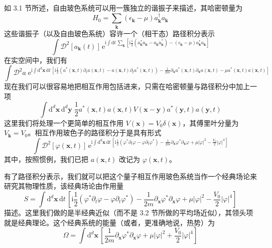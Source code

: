 如 3.1 节所述，自由玻色系统可以用一簇独立的谐振子来描述，其哈密顿量为
\begin{equation*}
H_0=\sum_{\pmb{k}}(\epsilon_{\pmb{k}}-\mu)a_{\pmb{k}}^{\dagger}a_{\pmb{k}}
\end{equation*}
这些谐振子（以及自由玻色系统）容许一个（相干态）路径积分表示
\begin{equation*}
\int\mathcal{D}^2\left[a_{\pmb{k}}(t)\right]\,\mathrm{e}^{\mathrm{i}\int \mathrm{d}t\,\sum_{\pmb{k}}\left[\mathrm{i}\frac{1}{2}(a_{\pmb{k}}^{*}\dot{a}_{\pmb{k}}-a_{\pmb{k}}\dot{a}_{\pmb{k}}^{*})-(\epsilon_{\pmb{k}}-\mu)a_{\pmb{k}}^{*}a_{\pmb{k}}\right]}
\end{equation*}
在实空间中，我们有
\begin{equation*}
\int\mathcal{D}^2a\;\mathrm{e}^{\mathrm{i}\int \mathrm{d}^d\pmb{x}\,\mathrm{d}t\,\left[\mathrm{i}\frac{1}{2}\left(a^{*}(\pmb{x},t)\partial_t a(\pmb{x},t)-a(\pmb{x},t)\partial_t a^{*}(\pmb{x},t)\right)-\frac{1}{2m}\partial_{\pmb{x}}a^{*}(\pmb{x},t)\partial_{\pmb{x}}a(\pmb{x},t)-\mu a^{*}(\pmb{x},t)a(\pmb{x},t)\right]}
\end{equation*}
现在我们可以很容易地把相互作用包括进来，只需在哈密顿量与路径积分中加上一项
\begin{equation*}
\int \mathrm{d}^d\pmb{x}\,\mathrm{d}^d\pmb{y}\;\frac{1}{2}a^{*}(\pmb{x},t)a(\pmb{x},t)V(\pmb{x}-\pmb{y})a^{*}(\pmb{y},t)a(\pmb{y},t)
\end{equation*}
这里我们将处理一个更简单的相互作用 $V(\pmb{x})=V_0\delta(\pmb{x})$，其傅里叶分量为 $V_{\pmb{k}}=V_0$。相互作用玻色子的路径积分于是具有形式
\begin{equation*}
\int\mathcal{D}^2\left[\varphi(\pmb{x},t)\right]\,\mathrm{e}^{\mathrm{i}\int \mathrm{d}^d\pmb{x}\,\mathrm{d}t\,\left[\mathrm{i}\frac{1}{2}(\varphi^{*}\partial_t\varphi-\varphi\partial_t\varphi^{*})-\frac{1}{2m}\partial_{\pmb{x}}\varphi^{*}\partial_{\pmb{x}}\varphi+\mu|\varphi|^2-\frac{V_0}{2}|\varphi|^4\right]}
\end{equation*}
其中，按照惯例，我们已把 $a(\pmb{x},t)$ 改记为 $\varphi(\pmb{x},t)$。


有了路径积分表示，我们就可以把这个量子相互作用玻色系统当作一个经典场论来研究其物理性质，该经典场论由作用量
\begin{equation*}
S=\int \mathrm{d}^d\pmb{x}\,\mathrm{d}t\,\left[\mathrm{i}\frac{1}{2}(\varphi^{*}\partial_t\varphi-\varphi\partial_t\varphi^{*})-\frac{1}{2m}\partial_{\pmb{x}}\varphi^{*}\partial_{\pmb{x}}\varphi+\mu|\varphi|^2-\frac{V_0}{2}|\varphi|^4\right]\tag{3.3.1}
\end{equation*}
描述。这里我们做的是半经典近似（而不是 3.2 节所做的平均场近似），其领头项就是经典理论。这个经典系统的能量（或者，更准确地说，热势）为
\begin{equation*}
\Omega=\int \mathrm{d}^d\pmb{x}\,\left[\frac{1}{2m}\partial_{\pmb{x}}\varphi^{*}\partial_{\pmb{x}}\varphi+\mu|\varphi|^2+\frac{V_0}{2}|\varphi|^4\right]\tag{3.3.2}
\end{equation*}

